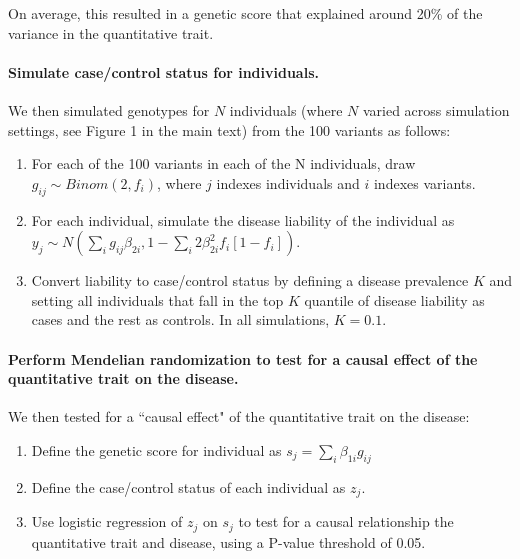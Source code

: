 \documentclass[11pt,titlepage]{article}
\begin{document}
On average, this resulted in a genetic score that explained around 20\% of the variance in the quantitative trait. 

\paragraph{Simulate case/control status for individuals.} We then simulated genotypes for $N$ individuals (where $N$ varied across simulation settings, see Figure 1 in the main text) from the 100 variants as follows:
\begin{enumerate}

\item For each of the 100 variants in each of the N individuals, draw $g_{ij} \sim Binom(2, f_i)$, where $j$ indexes individuals and $i$ indexes variants. 
\item For each individual, simulate the disease liability of the individual as $y_j \sim N( \sum_i g_{ij} \beta_{2i}, 1- \sum_i 2 \beta_{2i}^2 f_i [1-f_i] )$. 
\item Convert liability to case/control status by defining a disease prevalence $K$ and setting all individuals that fall in the top $K$ quantile of disease liability as cases and the rest as controls. In all simulations, $K = 0.1$. 
\end{enumerate}

\paragraph{Perform Mendelian randomization to test for a causal effect of the quantitative trait on the disease.} 
We then tested for a ``causal effect" of the quantitative trait on the disease:

\begin{enumerate}
\item Define the genetic score for individual as $s_j = \sum_i \beta_{1i} g_{ij}$
\item Define the case/control status of each individual as $z_j$. 
\item Use logistic regression of $z_j$ on $s_j$ to test for a causal relationship the quantitative trait and disease, using a P-value threshold of 0.05.
\end{enumerate} 
\end{document}
